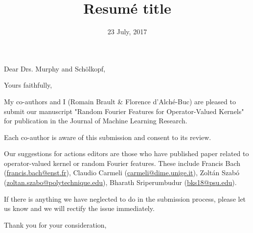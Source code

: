 \documentclass[11pt,a4paper,sans]{moderncv}        %
\title{Resum\'e title}                               %
\begin{document}
\date{23 July, 2017}
\opening{Dear Drs. Murphy and Sch\"olkopf,}
\closing{Yours faithfully,}
\makelettertitle

My co-authors and I (Romain Brault \& Florence d'Alch\'e-Buc) are pleased to
submit our manuscript "Random Fourier Features for Operator-Valued Kernels" for
publication in the Journal of Machine Learning Research.

\medskip

Each co-author is aware of this submission and consent to its review.

\medskip

Our suggestions for actions editors are those who have published
paper related to operator-valued kernel or random Fourier features. These
include Francis Bach (\href{mailto:francis.bach@ens.fr}{francis.bach@enst.fr}),
Claudio Carmeli (\href{mailto:carmeli@dime.unige.it}{carmeli@dime.unige.it}),
Zolt\'an Szab\'o
(\href{mailto:zoltan.szabo@polytechnique.edu}{zoltan.szabo@polytechnique.edu}),
Bharath Sriperumbudur (\href{mailto:bks18@psu.edu}{bks18@psu.edu}).

\medskip

If there is anything we have neglected to do in the submission process, please
let us know and we will rectify the issue immediately.

\medskip

Thank you for your consideration,

\makeletterclosing
\end{document}
